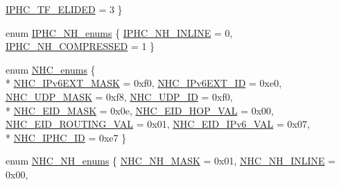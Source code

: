 \begin{DoxyCompactItemize}
\hyperlink{group___i_p_h_c_ggabd1bc92f5f7189d1c1a69f1dedf5b3bfae3d60430172746107f077a8b6cfca159}{I\+P\+H\+C\+\_\+\+T\+F\+\_\+\+E\+L\+I\+D\+ED} = 3
 \}
\item 
enum \hyperlink{group___i_p_h_c_gaf0d239d3843a392a4a775ba41471328f}{I\+P\+H\+C\+\_\+\+N\+H\+\_\+enums} \{ \hyperlink{group___i_p_h_c_ggaf0d239d3843a392a4a775ba41471328fa36eb5863fcf587436e0d54fce7a9dc8a}{I\+P\+H\+C\+\_\+\+N\+H\+\_\+\+I\+N\+L\+I\+NE} = 0, 
\hyperlink{group___i_p_h_c_ggaf0d239d3843a392a4a775ba41471328fa0d4cc09ac8fbbac8b95bb04a3f1d02e8}{I\+P\+H\+C\+\_\+\+N\+H\+\_\+\+C\+O\+M\+P\+R\+E\+S\+S\+ED} = 1
 \}
\item 
enum \hyperlink{group___i_p_h_c_ga1a87c0dc18c19390f31c5c79af59c751}{N\+H\+C\+\_\+enums} \{ \\*
\hyperlink{group___i_p_h_c_gga1a87c0dc18c19390f31c5c79af59c751ac63d7b6b4f5243bd13818e4f1fd4fd21}{N\+H\+C\+\_\+\+I\+Pv6\+E\+X\+T\+\_\+\+M\+A\+SK} = 0xf0, 
\hyperlink{group___i_p_h_c_gga1a87c0dc18c19390f31c5c79af59c751ac23ad0b45591c41e9300c403b7a42640}{N\+H\+C\+\_\+\+I\+Pv6\+E\+X\+T\+\_\+\+ID} = 0xe0, 
\hyperlink{group___i_p_h_c_gga1a87c0dc18c19390f31c5c79af59c751a11b631a6027548a2661af17422b0ff95}{N\+H\+C\+\_\+\+U\+D\+P\+\_\+\+M\+A\+SK} = 0xf8, 
\hyperlink{group___i_p_h_c_gga1a87c0dc18c19390f31c5c79af59c751a38f99c48ee29e413ed0c62bcd9fe5107}{N\+H\+C\+\_\+\+U\+D\+P\+\_\+\+ID} = 0xf0, 
\\*
\hyperlink{group___i_p_h_c_gga1a87c0dc18c19390f31c5c79af59c751a19f24fd75b1a62ab0d7b0f91150533fb}{N\+H\+C\+\_\+\+E\+I\+D\+\_\+\+M\+A\+SK} = 0x0e, 
\hyperlink{group___i_p_h_c_gga1a87c0dc18c19390f31c5c79af59c751a06c410ef29d083e5c5fdbbdb211746dc}{N\+H\+C\+\_\+\+E\+I\+D\+\_\+\+H\+O\+P\+\_\+\+V\+AL} = 0x00, 
\hyperlink{group___i_p_h_c_gga1a87c0dc18c19390f31c5c79af59c751a52e15e93d31ef2af91cc9ede289806cb}{N\+H\+C\+\_\+\+E\+I\+D\+\_\+\+R\+O\+U\+T\+I\+N\+G\+\_\+\+V\+AL} = 0x01, 
\hyperlink{group___i_p_h_c_gga1a87c0dc18c19390f31c5c79af59c751a9dd576f7fa26538dc48d90a1442a374c}{N\+H\+C\+\_\+\+E\+I\+D\+\_\+\+I\+Pv6\+\_\+\+V\+AL} = 0x07, 
\\*
\hyperlink{group___i_p_h_c_gga1a87c0dc18c19390f31c5c79af59c751a0ec2787078d173399d86ecac735fcfde}{N\+H\+C\+\_\+\+I\+P\+H\+C\+\_\+\+ID} = 0xe7
 \}
\item 
enum \hyperlink{group___i_p_h_c_ga73bb223d863ae25ed213760b45417d8f}{N\+H\+C\+\_\+\+N\+H\+\_\+enums} \{ \hyperlink{group___i_p_h_c_gga73bb223d863ae25ed213760b45417d8fa550814dfb610fdec2670165b63a21d52}{N\+H\+C\+\_\+\+N\+H\+\_\+\+M\+A\+SK} = 0x01, 
\hyperlink{group___i_p_h_c_gga73bb223d863ae25ed213760b45417d8fab1701d21df21eb84455c28d209269518}{N\+H\+C\+\_\+\+N\+H\+\_\+\+I\+N\+L\+I\+NE} = 0x00, 

\end{DoxyCompactItemize}
